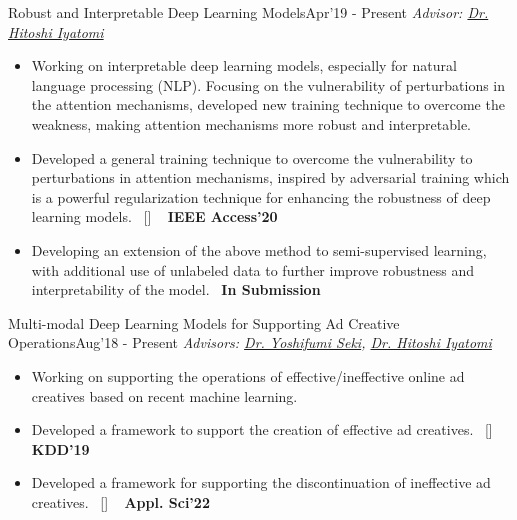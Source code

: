 \begin{projects}

\project
	{Robust and Interpretable Deep Learning Models}{Apr'19 - Present}
	{
	    \textit{Advisor:  \href{https://iyatomi-lab.info/english/people/2013-6-8}{Dr. Hitoshi Iyatomi}}
	}
	{\begin{itemize}
	\setlength\itemsep{0.3em}
     \item Working on interpretable deep learning models, especially for natural language processing (NLP). Focusing on the vulnerability of perturbations in the attention mechanisms, developed new training technique to overcome the weakness, making attention mechanisms more robust and interpretable.
     \item Developed a general training technique to overcome the vulnerability to perturbations in attention mechanisms, inspired by adversarial training which is a powerful regularization technique for enhancing the robustness of deep learning models.~ [\href{http://shunk031.github.io/attention-meets-perturbation/}{\small{\websiteSymbol}}] ~ {\small{\lbrack\textbf{{IEEE Access'20}}\rbrack}}
     \item Developing an extension of the above method to semi-supervised learning, with additional use of unlabeled data to further improve robustness and interpretability of the model.~ {\small{\lbrack\textbf{{In Submission}}\rbrack}}
     \end{itemize}}

\project
	{Multi-modal Deep Learning Models for Supporting Ad Creative Operations}{Aug'18 - Present}
	{
	    \textit{Advisors:  \href{https://scholar.google.com/citations?user=LoZ7VeYAAAAJ}{Dr. Yoshifumi Seki}, \href{https://iyatomi-lab.info/english/people/2013-6-8}{Dr. Hitoshi Iyatomi}}
	}
	{\begin{itemize}
	\setlength\itemsep{0.3em}
     \item Working on supporting the operations of effective/ineffective online ad creatives based on recent machine learning.
     \item Developed a framework to support the creation of effective ad creatives.~ [\href{https://github.com/shunk031/Multi-task-Conditional-Attention-Networks}{\small{\githubSymbol}}] ~ {\small{\lbrack\textbf{{KDD'19}}\rbrack}}
     \item Developed a framework for supporting the discontinuation of ineffective ad creatives.~ [\href{https://www.mdpi.com/2076-3417/12/7/3594}{\small{\websiteSymbol}}] ~ {\small{\lbrack\textbf{{Appl. Sci'22}}\rbrack}}
     \end{itemize}}


\end{projects}

